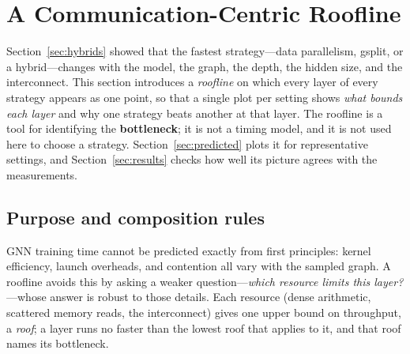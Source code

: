 \section{A Communication-Centric Roofline}
\label{sec:roofline}
\label{sec:simulator}  %

Section~\ref{sec:hybrids} showed that the fastest strategy---data parallelism, gsplit, or a
hybrid---changes with the model, the graph, the depth, the hidden size, and the interconnect.
This section introduces a \emph{roofline} on which every layer of every strategy appears as one
point, so that a single plot per setting shows \emph{what bounds each layer} and why one strategy
beats another at that layer. The roofline is a tool for identifying the \textbf{bottleneck}; it
is not a timing model, and it is not used here to choose a strategy. Section~\ref{sec:predicted}
plots it for representative settings, and Section~\ref{sec:results} checks how well its picture
agrees with the measurements.

\subsection{Purpose and composition rules}
\label{sec:cm-purpose}

GNN training time cannot be predicted exactly from first principles: kernel efficiency, launch
overheads, and contention all vary with the sampled graph. A roofline avoids this by asking a
weaker question---\emph{which resource limits this layer?}---whose answer is robust to those
details. Each resource (dense arithmetic, scattered memory reads, the interconnect) gives one
upper bound on throughput, a \emph{roof}; a layer runs no faster than the lowest roof that
applies to it, and that roof names its bottleneck.


